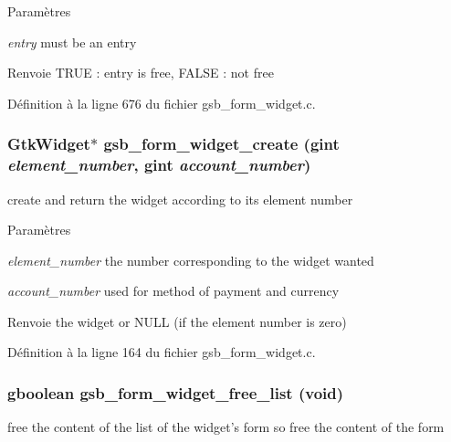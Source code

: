 \begin{DoxyParams}{Paramètres}
\item[{\em entry}]must be an entry\end{DoxyParams}
\begin{DoxyReturn}{Renvoie}
TRUE : entry is free, FALSE : not free 
\end{DoxyReturn}


Définition à la ligne 676 du fichier gsb\_\-form\_\-widget.c.

\subsubsection[{gsb\_\-form\_\-widget\_\-create}]{\setlength{\rightskip}{0pt plus 5cm}GtkWidget$\ast$ gsb\_\-form\_\-widget\_\-create (gint {\em element\_\-number}, \/  gint {\em account\_\-number})}\label{gsb__form__widget_8c_a12c6f45282e18968885785e41f434d50}
create and return the widget according to its element number


\begin{DoxyParams}{Paramètres}
\item[{\em element\_\-number}]the number corresponding to the widget wanted \item[{\em account\_\-number}]used for method of payment and currency\end{DoxyParams}
\begin{DoxyReturn}{Renvoie}
the widget or NULL (if the element number is zero) 
\end{DoxyReturn}


Définition à la ligne 164 du fichier gsb\_\-form\_\-widget.c.

\subsubsection[{gsb\_\-form\_\-widget\_\-free\_\-list}]{\setlength{\rightskip}{0pt plus 5cm}gboolean gsb\_\-form\_\-widget\_\-free\_\-list (void)}\label{gsb__form__widget_8c_acabcc2310e5c066c35065e2b8d2fdd73}
free the content of the list of the widget's form so free the content of the form



